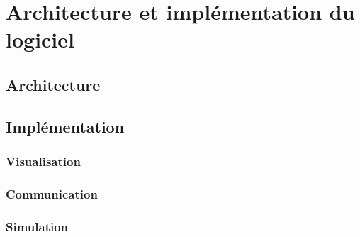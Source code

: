 \section{Architecture et implémentation du logiciel}

\subsection{Architecture}

\subsection{Implémentation}

\subsubsection{Visualisation}

\subsubsection{Communication}

\subsubsection{Simulation}